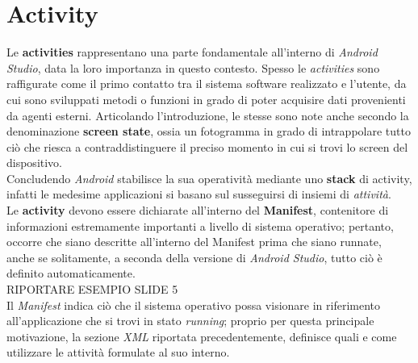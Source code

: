 \documentclass{article}
\begin{document}
\pagestyle{empty}

\section*{Activity}
\large

Le \textbf{activities} rappresentano una parte fondamentale all'interno di \textit{Android Studio}, data la loro importanza in questo contesto. Spesso le \textit{activities} sono raffigurate come il primo contatto tra il sistema software realizzato e l'utente, da cui sono sviluppati metodi o funzioni in grado di poter acquisire dati provenienti da agenti esterni. Articolando l'introduzione, le stesse sono note anche secondo la denominazione \textbf{screen state}, ossia un fotogramma in grado di intrappolare tutto ciò che riesca a contraddistinguere il preciso momento in cui si trovi lo screen del dispositivo. \vspace*{14pt}\\
Concludendo \textit{Android} stabilisce la sua operatività mediante uno \textbf{stack} di activity, infatti le medesime applicazioni si basano sul susseguirsi di insiemi di \textit{attività}.\vspace*{14pt}\\
Le \textbf{activity} devono essere dichiarate all'interno del \textbf{Manifest}, contenitore di informazioni estremamente importanti a livello di sistema operativo; pertanto, occorre che siano descritte all'interno del Manifest prima che siano runnate, anche se solitamente, a seconda della versione di \textit{Android Studio}, tutto ciò è definito automaticamente.\vspace*{14pt}\\
RIPORTARE ESEMPIO SLIDE 5\vspace*{14pt}\\
Il \textit{Manifest} indica ciò che il sistema operativo possa visionare in riferimento all'applicazione che si trovi in stato \textit{running}; proprio per questa principale motivazione, la sezione \textit{XML} riportata precedentemente, definisce quali e come utilizzare le attività formulate al suo interno.
\end{document}
